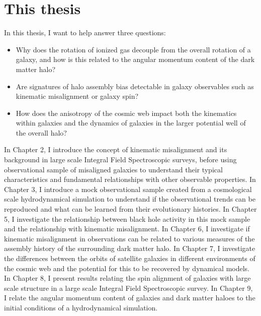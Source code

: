 \section{This thesis}
In this thesis, I want to help answer three questions:

\begin{itemize}
    
    \item Why does the rotation of ionized gas decouple from the overall rotation of a galaxy, and how is this related to the angular momentum content of the dark matter halo?
    
    \item Are signatures of halo assembly bias detectable in galaxy observables such as kinematic misalignment or galaxy spin? 
    
    \item How does the anisotropy of the cosmic web impact both the kinematics within galaxies and the dynamics of galaxies in the larger potential well of the overall halo?
    
\end{itemize}

In Chapter 2, I introduce the concept of kinematic misalignment and its background in large scale Integral Field Spectroscopic surveys, before using observational sample of misaligned galaxies to understand their typical characteristics and fundamental relationships with other observable properties. In Chapter 3, I introduce a mock observational sample created from a cosmological scale hydrodynamical simulation to understand if the observational trends can be reproduced and what can be learned from their evolutionary histories. In Chapter 5, I investigate the relationship between black hole activity in this mock sample and the relationship with kinematic misalignment. In Chapter 6, I investigate if kinematic misalignment in observations can be related to various measures of the assembly history of the surrounding dark matter halo. In Chapter 7, I investigate the differences between the orbits of satellite galaxies in different environments of the cosmic web and the potential for this to be recovered by dynamical models. In Chapter 8, I present results relating the spin alignment of galaxies with large scale structure in a large scale Integral Field Spectroscopic survey. In Chapter 9, I relate the angular momentum content of galaxies and dark matter haloes to the initial conditions of a hydrodynamical simulation.